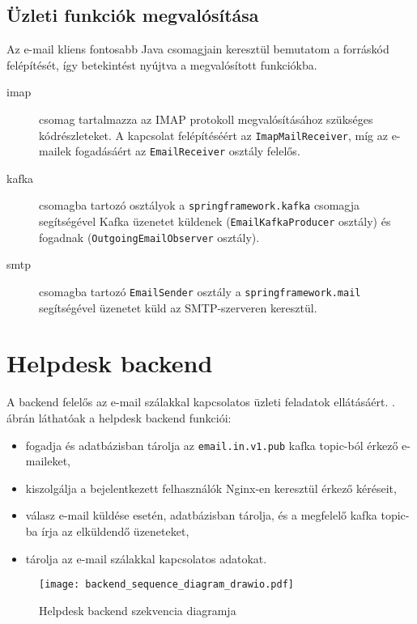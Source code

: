 \subsection{Üzleti funkciók megvalósítása}
Az e-mail kliens fontosabb Java csomagjain keresztül bemutatom a forráskód felépítését, így betekintést nyújtva a megvalósított funkciókba.

\begin{description}
	\item[imap] csomag tartalmazza az IMAP protokoll megvalósításához szükséges kódrészleteket. A kapcsolat felépítéséért az \texttt{ImapMailReceiver}, míg az e-mailek fogadásáért az \texttt{EmailReceiver} osztály felelős. 
	
	\item[kafka] csomagba tartozó osztályok a \texttt{springframework.kafka} csomagja segítségével Kafka üzenetet küldenek (\texttt{EmailKafkaProducer} osztály) és fogadnak (\texttt{OutgoingEmailObserver} osztály).
	
	\item[smtp] csomagba tartozó \texttt{EmailSender} osztály a \texttt{springframework.mail} segítségével üzenetet küld az SMTP-szerveren keresztül.
\end{description}


\pagebreak
\section{Helpdesk backend}\label{sec:backend}
A backend felelős az e-mail szálakkal kapcsolatos üzleti feladatok ellátásáért. . ábrán láthatóak a helpdesk backend funkciói:
\begin{itemize}
	\item fogadja és adatbázisban tárolja az \texttt{email.in.v1.pub} kafka topic-ból érkező e-maileket, 
	\item kiszolgálja a bejelentkezett felhasználók Nginx-en keresztül érkező kéréseit,
	\item válasz e-mail küldése esetén, adatbázisban tárolja, és a megfelelő kafka topic-ba írja az elküldendő üzeneteket,
	\item tárolja az e-mail szálakkal kapcsolatos adatokat.
\end{itemize}


\begin{figure}[hbt] 
	\centering
	\texttt{[image: backend\_sequence\_diagram\_drawio.pdf]}
	\caption{Helpdesk backend szekvencia diagramja}
	\label{fig:backend_sequence_diagram}
\end{figure}


